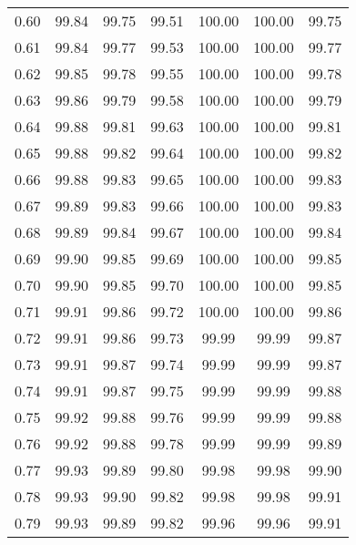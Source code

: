 \begin{tabular}{|c|c|c|c|c|c|c|}
      0.60 &     99.84 &     99.75 &      99.51 &  100.00 &     100.00 &         99.75 \\
      0.61 &     99.84 &     99.77 &      99.53 &  100.00 &     100.00 &         99.77 \\
      0.62 &     99.85 &     99.78 &      99.55 &  100.00 &     100.00 &         99.78 \\
      0.63 &     99.86 &     99.79 &      99.58 &  100.00 &     100.00 &         99.79 \\
      0.64 &     99.88 &     99.81 &      99.63 &  100.00 &     100.00 &         99.81 \\
      0.65 &     99.88 &     99.82 &      99.64 &  100.00 &     100.00 &         99.82 \\
      0.66 &     99.88 &     99.83 &      99.65 &  100.00 &     100.00 &         99.83 \\
      0.67 &     99.89 &     99.83 &      99.66 &  100.00 &     100.00 &         99.83 \\
      0.68 &     99.89 &     99.84 &      99.67 &  100.00 &     100.00 &         99.84 \\
      0.69 &     99.90 &     99.85 &      99.69 &  100.00 &     100.00 &         99.85 \\
      0.70 &     99.90 &     99.85 &      99.70 &  100.00 &     100.00 &         99.85 \\
      0.71 &     99.91 &     99.86 &      99.72 &  100.00 &     100.00 &         99.86 \\
      0.72 &     99.91 &     99.86 &      99.73 &   99.99 &      99.99 &         99.87 \\
      0.73 &     99.91 &     99.87 &      99.74 &   99.99 &      99.99 &         99.87 \\
      0.74 &     99.91 &     99.87 &      99.75 &   99.99 &      99.99 &         99.88 \\
      0.75 &     99.92 &     99.88 &      99.76 &   99.99 &      99.99 &         99.88 \\
      0.76 &     99.92 &     99.88 &      99.78 &   99.99 &      99.99 &         99.89 \\
      0.77 &     99.93 &     99.89 &      99.80 &   99.98 &      99.98 &         99.90 \\
      0.78 &     99.93 &     99.90 &      99.82 &   99.98 &      99.98 &         99.91 \\
      0.79 &     99.93 &     99.89 &      99.82 &   99.96 &      99.96 &         99.91 \\

\end{tabular}
